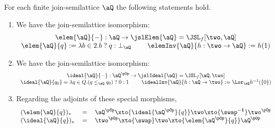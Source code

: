 \documentclass{article}
\begin{document}
\begin{lemma}
\label{lem:jsl_elem_iso}
For each finite join-semilattice $\aQ$ the following statements hold.
\begin{enumerate}
\item
We have the join-semilattice isomorphism:
\[
\begin{tabular}{c}
$\elem{\aQ}{-} : \aQ \to \jslElem{\aQ} = \JSL_f[\two,\aQ]$
\\
$\elem{\aQ}{q} := \lambda b \in 2. b \; ? \; q : \bot_\aQ$
\qquad
$\elemInv{\aQ}{h : \two \to \aQ} := h(1)$
\end{tabular}
\]

\item
We have the join-semilattice isomorphism:
\[
\begin{tabular}{c}
$\ideal{\aQ}{-} : \aQ^{\pOp} \to \jslIdeal{\aQ} = \JSL_f[\aQ,\two]$
\\
$\ideal{\aQ}{q_0} = \lambda q \in Q. (q \leq_\aQ q_0) \; ? \; 0 : 1$
\qquad
$\idealInv{\aQ}{h : \aQ \to \two} := \Lor_\aQ h^{-1}(\{0\})$
\end{tabular}
\]

\item
Regarding the adjoints of these special morphisms, 
\[
\begin{tabular}{lll}
$(\elem{\aQ}{q})_*$ & $=$ & $\aQ^{\pOp} \xto{\ideal{\aQ^{\pOp}}{q}} \two \xto{\swap^{\bf-1}} \two^{\pOp}$
\\
$(\ideal{\aQ}{q})_*$ & $=$ & $\two^{\pOp} \xto{\swap} \two \xto{\elem{\aQ^{\pOp}}{q}} \aQ^{\pOp}$
\end{tabular}
\]


\end{enumerate}
\end{lemma}
\end{document}
